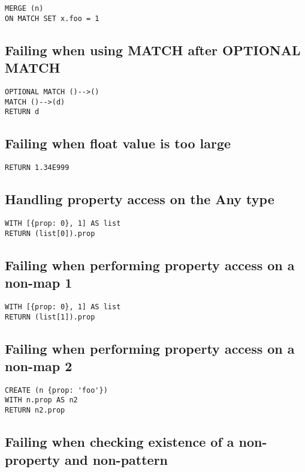 \begin{lstlisting}
MERGE (n)
ON MATCH SET x.foo = 1
\end{lstlisting}

\subsection{Failing when using MATCH after OPTIONAL MATCH}

\begin{lstlisting}
OPTIONAL MATCH ()-->()
MATCH ()-->(d)
RETURN d
\end{lstlisting}

\subsection{Failing when float value is too large}

\begin{lstlisting}
RETURN 1.34E999
\end{lstlisting}

\subsection{Handling property access on the Any type}

\begin{lstlisting}
WITH [{prop: 0}, 1] AS list
RETURN (list[0]).prop
\end{lstlisting}

\subsection{Failing when performing property access on a non-map 1}

\begin{lstlisting}
WITH [{prop: 0}, 1] AS list
RETURN (list[1]).prop
\end{lstlisting}

\subsection{Failing when performing property access on a non-map 2}

\begin{lstlisting}
CREATE (n {prop: 'foo'})
WITH n.prop AS n2
RETURN n2.prop
\end{lstlisting}

\subsection{Failing when checking existence of a non-property and non-pattern}

